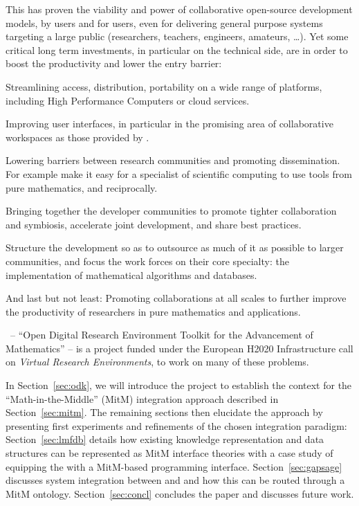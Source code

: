 This has proven the viability and power of collaborative open-source development models,
by users and for users, even for delivering general purpose systems targeting a large
public (researchers, teachers, engineers, amateurs, \ldots). Yet some critical long term
investments, in particular on the technical side, are in order to boost the productivity
and lower the entry barrier:
\begin{compactitem}
\item Streamlining access, distribution, portability on a wide range of platforms, including
  High Performance Computers or cloud services.
\item Improving user interfaces, in particular in the promising area of collaborative
  workspaces as those provided by \SMC.
\item Lowering barriers between research communities and promoting dissemination. For example
  make it easy for a specialist of scientific computing to use tools from pure
  mathematics, and reciprocally.
\item Bringing together the developer communities to promote tighter collaboration and
  symbiosis, accelerate joint development, and share best practices.
\item Structure the development so as to outsource as much of it as possible to larger communities, and focus
  the work forces on their core specialty: the implementation of mathematical algorithms
  and databases.
\item And last but not least: Promoting collaborations at all scales to further improve
  the productivity of researchers in pure mathematics and applications.
\end{compactitem}

\ODK\, -- ``Open Digital Research Environment Toolkit for the Advancement
of Mathematics'' \cite{OpenDreamKit:on} -- is a project funded under the
European H2020 Infrastructure call \cite{EINFRA-9} on \emph{Virtual
  Research Environments}, to work on many of these problems.

In Section~\ref{sec:odk}, we will introduce the \ODK project  to establish the context for the
``Math-in-the-Middle'' (MitM) integration approach described in
Section~\ref{sec:mitm}. The remaining sections then elucidate the approach by presenting
first experiments and refinements of the chosen integration paradigm:
Section~\ref{sec:lmfdb} details how existing knowledge representation and data structures
can be represented as MitM interface theories with a case study of equipping the \LMFDB
with a MitM-based programming interface.  Section~\ref{sec:gapsage} discusses system
integration between \GAP and \Sage and how this can be routed through a MitM
ontology. Section~\ref{sec:concl} concludes the paper and discusses future work.


